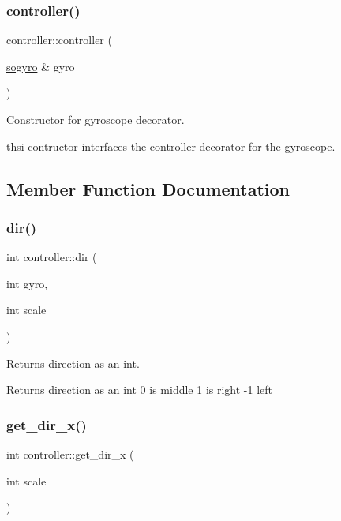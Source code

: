 \subsubsection{\texorpdfstring{controller()}{controller()}}
{\footnotesize\ttfamily controller\+::controller (\begin{DoxyParamCaption}\item[{\hyperlink{classsogyro}{sogyro} \&}]{gyro }\end{DoxyParamCaption})\hspace{0.3cm}{\ttfamily [inline]}}



Constructor for gyroscope decorator. 

thsi contructor interfaces the controller decorator for the gyroscope. 

\subsection{Member Function Documentation}
\mbox{\label{classcontroller_a08706a1d0b65e1e75cd136205861c3bb}} 
\subsubsection{\texorpdfstring{dir()}{dir()}}
{\footnotesize\ttfamily int controller\+::dir (\begin{DoxyParamCaption}\item[{int}]{gyro,  }\item[{int}]{scale }\end{DoxyParamCaption})\hspace{0.3cm}{\ttfamily [inline]}}



Returns direction as an int. 

Returns direction as an int 0 is middle 1 is right -\/1 left \mbox{\label{classcontroller_a0f32b7bba7ac0026bbdcde8de15eeb73}} 
\subsubsection{\texorpdfstring{get\+\_\+dir\+\_\+x()}{get\_dir\_x()}}
{\footnotesize\ttfamily int controller\+::get\+\_\+dir\+\_\+x (\begin{DoxyParamCaption}\item[{int}]{scale }\end{DoxyParamCaption})\hspace{0.3cm}{\ttfamily [inline]}}



